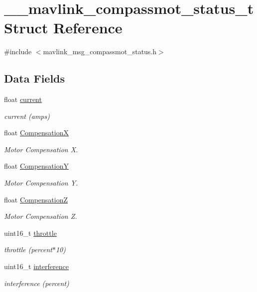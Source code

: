\hypertarget{struct____mavlink__compassmot__status__t}{\section{\+\_\+\+\_\+mavlink\+\_\+compassmot\+\_\+status\+\_\+t Struct Reference}
\label{struct____mavlink__compassmot__status__t}
}


{\ttfamily \#include $<$mavlink\+\_\+msg\+\_\+compassmot\+\_\+status.\+h$>$}

\subsection*{Data Fields}
\begin{DoxyCompactItemize}
\item 
float \hyperlink{struct____mavlink__compassmot__status__t_af96c75605fcfa4885b67879ca6d305d1}{current}
\begin{DoxyCompactList}\small\item\em current (amps) \end{DoxyCompactList}\item 
float \hyperlink{struct____mavlink__compassmot__status__t_abb53d2a0bf95828bd5b149110db0c909}{Compensation\+X}
\begin{DoxyCompactList}\small\item\em Motor Compensation X. \end{DoxyCompactList}\item 
float \hyperlink{struct____mavlink__compassmot__status__t_ad4908ba22070bec4a852a66b0fccbf66}{Compensation\+Y}
\begin{DoxyCompactList}\small\item\em Motor Compensation Y. \end{DoxyCompactList}\item 
float \hyperlink{struct____mavlink__compassmot__status__t_ad8a780fcd83dcdfa69e32bcef666fe87}{Compensation\+Z}
\begin{DoxyCompactList}\small\item\em Motor Compensation Z. \end{DoxyCompactList}\item 
uint16\+\_\+t \hyperlink{struct____mavlink__compassmot__status__t_a0a15f56f6f13141e00c97835ff8ed944}{throttle}
\begin{DoxyCompactList}\small\item\em throttle (percent$\ast$10) \end{DoxyCompactList}\item 
uint16\+\_\+t \hyperlink{struct____mavlink__compassmot__status__t_a2a1161e6df8225604079692d4bf114b3}{interference}
\begin{DoxyCompactList}\small\item\em interference (percent) \end{DoxyCompactList}\end{DoxyCompactItemize}



